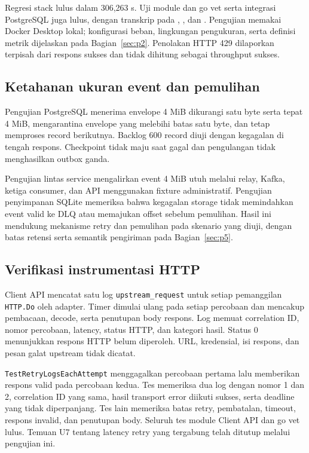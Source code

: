Regresi stack lulus dalam 306,263 s. Uji module dan go vet serta integrasi PostgreSQL juga lulus, dengan transkrip pada , , dan . Pengujian memakai Docker Desktop lokal; konfigurasi beban, lingkungan pengukuran, serta definisi metrik dijelaskan pada Bagian~\ref{sec:p2}. Penolakan HTTP 429 dilaporkan terpisah dari respons sukses dan tidak dihitung sebagai throughput sukses.



\subsection{Ketahanan ukuran event dan pemulihan}
Pengujian PostgreSQL menerima envelope 4 MiB dikurangi satu byte serta tepat 4 MiB, mengarantina envelope yang melebihi batas satu byte, dan tetap memproses record berikutnya. Backlog 600 record diuji dengan kegagalan di tengah respons. Checkpoint tidak maju saat gagal dan pengulangan tidak menghasilkan outbox ganda.

Pengujian lintas service mengalirkan event 4 MiB utuh melalui relay, Kafka, ketiga consumer, dan API menggunakan fixture administratif. Pengujian penyimpanan SQLite memeriksa bahwa kegagalan storage tidak memindahkan event valid ke DLQ atau memajukan offset sebelum pemulihan. Hasil ini mendukung mekanisme retry dan pemulihan pada skenario yang diuji, dengan batas retensi serta semantik pengiriman pada Bagian~\ref{sec:p5}.

\subsection{Verifikasi instrumentasi HTTP}
Client API mencatat satu log \texttt{upstream\_request} untuk setiap pemanggilan \texttt{HTTP.Do} oleh adapter. Timer dimulai ulang pada setiap percobaan dan mencakup pembacaan, decode, serta penutupan body respons. Log memuat correlation ID, nomor percobaan, latency, status HTTP, dan kategori hasil. Status 0 menunjukkan respons HTTP belum diperoleh. URL, kredensial, isi respons, dan pesan galat upstream tidak dicatat.

\texttt{TestRetryLogsEachAttempt} menggagalkan percobaan pertama lalu memberikan respons valid pada percobaan kedua. Tes memeriksa dua log dengan nomor 1 dan 2, correlation ID yang sama, hasil transport error diikuti sukses, serta deadline yang tidak diperpanjang. Tes lain memeriksa batas retry, pembatalan, timeout, respons invalid, dan penutupan body. Seluruh tes module Client API dan go vet lulus. Temuan U7 tentang latency retry yang tergabung telah ditutup melalui pengujian ini.

